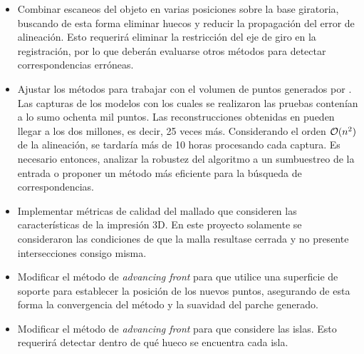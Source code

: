 \begin{itemize}
	\item Combinar escaneos del objeto en varias posiciones sobre la base giratoria,
		buscando de esta forma eliminar huecos y reducir la propagación del error de alineación.
		Esto requerirá eliminar la restricción del eje de giro en la
		registración, por lo que deberán evaluarse otros métodos para detectar
		correspondencias erróneas.
	\item Ajustar los métodos para trabajar con el volumen de puntos generados
		por \cite{Pancho}.  Las capturas de los modelos con los cuales se
		realizaron las pruebas contenían a lo sumo ochenta mil puntos. Las
		reconstrucciones obtenidas en \cite{Pancho} pueden llegar a los
		dos millones, es decir, 25 veces más.
		Considerando el orden $\mathcal{O}(n^2)$ de la alineación,
		se tardaría más de 10 horas procesando cada captura.
		Es necesario entonces, analizar la robustez del algoritmo a un sumbuestreo de la entrada
		o proponer un método más eficiente para la búsqueda de correspondencias.
	\item Implementar métricas de calidad del mallado que consideren las
		características de la impresión 3D.
		En este proyecto solamente se consideraron las condiciones de que la malla
		resultase cerrada y no presente intersecciones consigo misma.
	\item Modificar el método de \emph{advancing front} para que utilice una
		superficie de soporte para establecer la posición de los nuevos puntos,
		asegurando de esta forma la convergencia del método y la suavidad del
		parche generado.
	\item Modificar el método de \emph{advancing front} para que considere las islas.
		Esto requerirá detectar dentro de qué hueco se encuentra cada isla.
\end{itemize}
